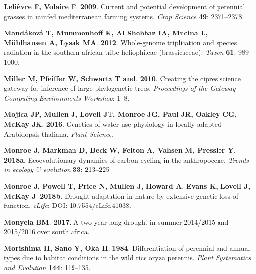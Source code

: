 \documentclass[man,floatsintext]{apa6}
\theoremstyle{definition}
\theoremstyle{definition}
\theoremstyle{definition}
\theoremstyle{remark}
\begin{document}
\leavevmode\hypertarget{ref-lelievre2009current}{}%
\textbf{\textnormal{Lelièvre F}, \textnormal{Volaire F}}. \textbf{2009}.
Current and potential development of perennial grasses in rainfed
mediterranean farming systems. \emph{Crop Science} \textbf{49}:
2371--2378.

\leavevmode\hypertarget{ref-mandakova2012whole}{}%
\textbf{\textnormal{Mandáková T}, \textnormal{Mummenhoff K},
\textnormal{Al-Shehbaz IA}, \textnormal{Mucina L},
\textnormal{Mühlhausen A}, \textnormal{Lysak MA}}. \textbf{2012}.
Whole-genome triplication and species radiation in the southern african
tribe heliophileae (brassicaceae). \emph{Taxon} \textbf{61}: 989--1000.

\leavevmode\hypertarget{ref-miller2010creating}{}%
\textbf{\textnormal{Miller M}, \textnormal{Pfeiffer W},
\textnormal{Schwartz T and}}. \textbf{2010}. Creating the cipres science
gateway for inference of large phylogenetic trees. \emph{Proceedings of
the Gateway Computing Environments Workshop}: 1--8.

\leavevmode\hypertarget{ref-Mojica2016}{}%
\textbf{\textnormal{Mojica JP}, \textnormal{Mullen J},
\textnormal{Lovell JT}, \textnormal{Monroe JG}, \textnormal{Paul JR},
\textnormal{Oakley CG}, \textnormal{McKay JK}}. \textbf{2016}. Genetics
of water use physiology in locally adapted Arabidopsis thaliana.
\emph{Plant Science}.

\leavevmode\hypertarget{ref-monroe2018ecoevolutionary}{}%
\textbf{\textnormal{Monroe J}, \textnormal{Markman D}, \textnormal{Beck
W}, \textnormal{Felton A}, \textnormal{Vahsen M}, \textnormal{Pressler
Y}}. \textbf{2018a}. Ecoevolutionary dynamics of carbon cycling in the
anthropocene. \emph{Trends in ecology \& evolution} \textbf{33}:
213--225.

\leavevmode\hypertarget{ref-monroe2018drought}{}%
\textbf{\textnormal{Monroe J}, \textnormal{Powell T}, \textnormal{Price
N}, \textnormal{Mullen J}, \textnormal{Howard A}, \textnormal{Evans K},
\textnormal{Lovell J}, \textnormal{McKay J}}. \textbf{2018b}. Drought
adaptation in nature by extensive genetic loss-of-function.
\emph{eLife}: DOI: 10.7554/eLife.41038.

\leavevmode\hypertarget{ref-monyela2017two}{}%
\textbf{\textnormal{Monyela BM}}. \textbf{2017}. A two-year long drought
in summer 2014/2015 and 2015/2016 over south africa.

\leavevmode\hypertarget{ref-morishima1984differentiation}{}%
\textbf{\textnormal{Morishima H}, \textnormal{Sano Y}, \textnormal{Oka
H}}. \textbf{1984}. Differentiation of perennial and annual types due to
habitat conditions in the wild rice oryza perennis. \emph{Plant
Systematics and Evolution} \textbf{144}: 119--135.
\end{document}
